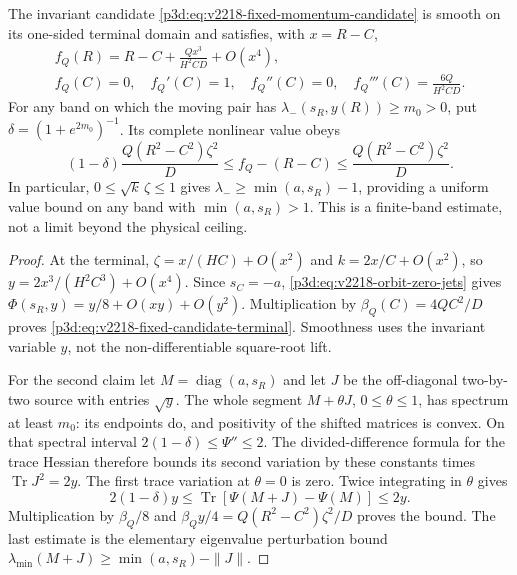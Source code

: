 \documentclass[12pt,a4paper]{article}
\begin{document}
\begin{theorem}
\label{p3d:thm:v2218-fixed-candidate-endpoints}
The invariant candidate \eqref{p3d:eq:v2218-fixed-momentum-candidate}
is smooth on its one-sided terminal domain and satisfies, with
$x=R-C$,
\begin{equation}
 \boxed{\begin{gathered}
 f_Q(R)=R-C+\frac{Qx^3}{H^2CD}+O(x^4),\\
 f_Q(C)=0,\quad f_Q'(C)=1,\quad f_Q''(C)=0,\quad
 f_Q'''(C)=\frac{6Q}{H^2CD}.
 \end{gathered}}
 \label{p3d:eq:v2218-fixed-candidate-terminal}
\end{equation}
For any band on which the moving pair has
$\lambda_-(s_R,y(R))\ge m_0>0$, put
$\delta=(1+e^{2m_0})^{-1}$.  Its complete nonlinear value obeys
\begin{equation}
 \boxed{(1-\delta)\frac{Q(R^2-C^2)\zeta^2}{D}
 \le f_Q-(R-C)
 \le\frac{Q(R^2-C^2)\zeta^2}{D}.}
 \label{p3d:eq:v2218-fixed-candidate-UV-bound}
\end{equation}
In particular, $0\le\sqrt{k}\,\zeta\le1$ gives
$\lambda_-\ge\min(a,s_R)-1$, providing a uniform value bound on
any band with $\min(a,s_R)>1$.  This is a finite-band estimate, not
a limit beyond the physical ceiling.
\end{theorem}
\begin{proof}
At the terminal, $\zeta=x/(HC)+O(x^2)$ and
$k=2x/C+O(x^2)$, so
$y=2x^3/(H^2C^3)+O(x^4)$.  Since
$s_C=-a$, \eqref{p3d:eq:v2218-orbit-zero-jets} gives
$\Phi(s_R,y)=y/8+O(xy)+O(y^2)$.
Multiplication by $\beta_Q(C)=4QC^2/D$ proves
\eqref{p3d:eq:v2218-fixed-candidate-terminal}.  Smoothness uses the
invariant variable $y$, not the non-differentiable square-root lift.

For the second claim let $M=\operatorname{diag}(a,s_R)$ and let $J$
be the off-diagonal two-by-two source with entries $\sqrt y$.
The whole segment $M+\theta J$, $0\le\theta\le1$, has spectrum
at least $m_0$: its endpoints do, and positivity of the shifted
matrices is convex.  On that spectral interval
$2(1-\delta)\le\Psi''\le2$.  The divided-difference formula for
the trace Hessian therefore bounds its second variation by these
constants times $\operatorname{Tr}J^2=2y$.
The first trace variation at $\theta=0$ is zero.  Twice integrating
in $\theta$ gives
\[
 2(1-\delta)y\le
 \operatorname{Tr}[\Psi(M+J)-\Psi(M)]\le2y.
\]
Multiplication by $\beta_Q/8$ and
$\beta_Qy/4=Q(R^2-C^2)\zeta^2/D$ proves the bound.
The last estimate is the elementary eigenvalue perturbation bound
$\lambda_{\min}(M+J)\ge\min(a,s_R)-\|J\|$.
\end{proof}
\end{document}
